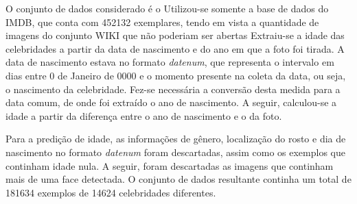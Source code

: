 O conjunto de dados considerado é o 
Utilizou-se somente a base de dados do IMDB, que conta com 452132 exemplares, tendo em vista a quantidade de imagens do conjunto WIKI que não poderiam ser abertas
Extraiu-se a idade das celebridades a partir da data de nascimento e do ano em que a foto foi tirada. A data de nascimento estava no formato \emph{datenum}, que representa o intervalo em dias entre $0$ de Janeiro de $0000$ e o momento presente na coleta da data, ou seja, o nascimento da celebridade. Fez-se necessária a conversão desta medida para a data comum, de onde foi extraído o ano de nascimento. A seguir, calculou-se a idade a partir da diferença entre o ano de nascimento e o da foto.

Para a predição de idade, as informações de gênero, localização do rosto e dia de nascimento no formato \emph{datenum} foram descartadas, assim como os exemplos que continham idade nula. A seguir, foram descartadas as imagens que continham mais de uma face detectada. O conjunto de dados resultante continha um total de 181634 exemplos de 14624 celebridades diferentes.
